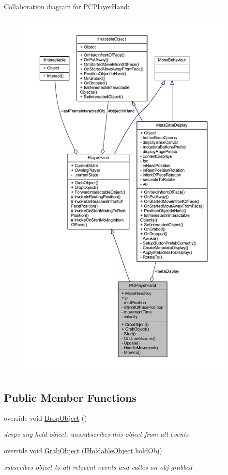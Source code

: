 Collaboration diagram for P\+C\+Player\+Hand\+:
\nopagebreak
\begin{figure}[H]
\begin{center}
\leavevmode
\includegraphics[height=550pt]{class_p_c_player_hand__coll__graph}
\end{center}
\end{figure}
\subsection*{Public Member Functions}
\begin{DoxyCompactItemize}
\item 
override void \mbox{\hyperlink{class_p_c_player_hand_a42c7ffd95f8493901c93e2c1e4576585}{Drop\+Object}} ()
\begin{DoxyCompactList}\small\item\em drops any held object, unssubscribes this object from all events \end{DoxyCompactList}\item 
override void \mbox{\hyperlink{class_p_c_player_hand_a08da28b459501727d269733569559c24}{Grab\+Object}} (\mbox{\hyperlink{interface_i_holdable_object}{I\+Holdable\+Object}} hold\+Obj)
\begin{DoxyCompactList}\small\item\em subscribes object to all relevent events and calles on obj grabbed \end{DoxyCompactList}\end{DoxyCompactItemize}

